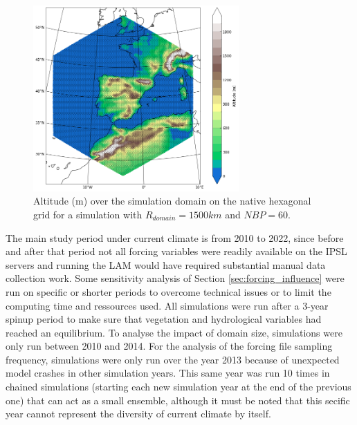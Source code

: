 
\begin{figure}[hbtp]
    \centering
    \includegraphics[width=0.7\textwidth]{images/chap4/article/f01.png}
    \caption{Altitude (m) over the simulation domain on the native hexagonal grid for a simulation with $R_{domain}=1500 km$ and $NBP=60$.}
    \label{fig:domain_full_hex}
\end{figure}

The main study period under current climate is from 2010 to 2022, since before and after that period not all forcing variables were readily available on the IPSL servers and running the LAM would have required substantial manual data collection work. Some sensitivity analysis of Section \ref{sec:forcing_influence} were run on specific or shorter periods to overcome technical issues or to limit the computing time and ressources used.
All simulations were run after a 3-year spinup period to make sure that vegetation and hydrological variables had reached an equilibrium. 
To analyse the impact of domain size, simulations were only run between 2010 and 2014. 
For the analysis of the forcing file sampling frequency, simulations were only run over the year 2013 because of unexpected model crashes in other simulation years. This same year was run 10 times in chained simulations (starting each new simulation year at the end of the previous one) that can act as a small ensemble, although it must be noted that this secific year cannot represent the diversity of current climate by itself.

